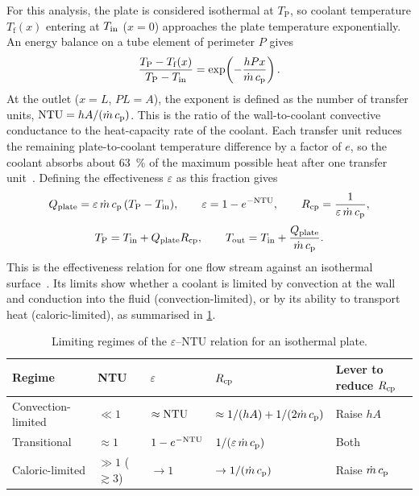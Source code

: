 For this analysis, the plate is considered isothermal at $T_{\mathrm{P}}$, so
coolant temperature $T_{\mathrm{f}}(x)$ entering at $T_{\mathrm{in}}$ ($x = 0$) approaches the plate temperature exponentially. An
energy balance on a tube element of perimeter $P$ gives~\cite{bergman_fundamentals_2017}
\begin{equation}
  \frac{T_{\mathrm{P}} - T_{\mathrm{f}}(x)}{T_{\mathrm{P}} - T_{\mathrm{in}}}
    = \exp\!\left(-\frac{hPx}{\dot{m}\,c_{\mathrm{p}}}\right).
  \label{eq:temp-profile}
\end{equation}
At the outlet ($x = L$, $PL = A$), the exponent is defined as the number of
transfer units, $\mathrm{NTU} = hA/(\dot{m}\,c_{\mathrm{p}})$. This is the ratio of the
wall-to-coolant convective conductance to the heat-capacity rate of the coolant.
Each transfer unit reduces the remaining plate-to-coolant temperature difference
by a factor of $e$, so the coolant absorbs about \SI{63}{\percent} of the maximum
possible heat after one transfer unit~\cite{bergman_fundamentals_2017}. Defining
the effectiveness $\varepsilon$ as this fraction gives
\begin{equation}
  Q_{\mathrm{plate}} = \varepsilon\,\dot{m}\,c_{\mathrm{p}}\,(T_{\mathrm{P}} - T_{\mathrm{in}}), \qquad
  \varepsilon = 1 - e^{-\mathrm{NTU}}, \qquad
  R_{\mathrm{cp}} = \frac{1}{\varepsilon\,\dot{m}\,c_{\mathrm{p}}},
  \label{eq:effectiveness}
\end{equation}
\begin{equation}
  T_{\mathrm{P}} = T_{\mathrm{in}} + Q_{\mathrm{plate}}R_{\mathrm{cp}}, \qquad
  T_{\mathrm{out}} = T_{\mathrm{in}} + \frac{Q_{\mathrm{plate}}}{\dot{m}\,c_{\mathrm{p}}}.
  \label{eq:plate-outlet}
\end{equation}
This is the effectiveness relation for one flow stream against an isothermal
surface~\cite{bergman_fundamentals_2017}. Its limits show whether a coolant is
limited by convection at the wall and conduction into the fluid (convection-limited), or by its ability to transport heat
(caloric-limited), as summarised in \cref{tab:ntu-regimes}.

\begin{table}[htbp]
  \centering
  \caption{Limiting regimes of the $\varepsilon$--NTU relation for an isothermal
    plate.}
  \label{tab:ntu-regimes}
  \small
  \begin{tabular}{@{}lllll@{}}
    \toprule
    Regime & NTU & $\varepsilon$ & $R_{\mathrm{cp}}$ & Lever to reduce $R_{\mathrm{cp}}$ \\
    \midrule
    Convection-limited & $\ll 1$ & $\approx \mathrm{NTU}$ &
      $\approx 1/(hA) + 1/(2\dot{m}\,c_{\mathrm{p}})$ & Raise $hA$ \\
    Transitional & $\approx 1$ & $1 - e^{-\mathrm{NTU}}$ &
      $1/(\varepsilon\,\dot{m}\,c_{\mathrm{p}})$ & Both \\
    Caloric-limited & $\gg 1$ ($\gtrsim 3$) & $\to 1$ &
      $\to 1/(\dot{m}\,c_{\mathrm{p}})$ & Raise $\dot{m}\,c_{\mathrm{p}}$ \\
    \bottomrule
  \end{tabular}
\end{table}

